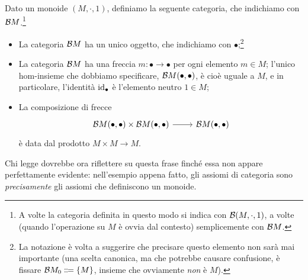 \begin{theorem}\label{mon_sonocat}
 Dato un monoide \((M,\cdot,1)\), definiamo la seguente categoria, che indichiamo con \(\mathcal{B} M\).\footnote{A volte la categoria definita in questo modo si indica con \(\mathcal{B}(M,\cdot,1)\), a volte (quando l'operazione su \(M\) è ovvia dal contesto) semplicemente con \(\mathcal{B} M\).}
 \begin{itemize}
  \item La categoria \(\mathcal{B} M\) ha un unico oggetto, che indichiamo con \(\bullet\);\footnote{La notazione è volta a suggerire che precisare questo elemento non sarà mai importante (una scelta canonica, ma che potrebbe causare confusione, è fissare \(\susp M_0 \defeq  \{M\}\), insieme che ovviamente \emph{non} è \(M\)).}
  \item La categoria \(\mathcal{B} M\) ha una freccia \(m\colon\bullet\to\bullet\) per ogni elemento \(m\in M\); l'unico hom-insieme che dobbiamo specificare, \(\mathcal{B} M(\bullet,\bullet)\), è cioè uguale a \(M\), e in particolare, l'identità \(\mathrm{id}_\bullet\) è l'elemento neutro \(1\in M\);
  \item La composizione di frecce
        \[\longmor{\Hom{\susp M}(\bullet,\bullet)\times \Hom{\susp M}(\bullet,\bullet)}{\Hom{\susp M}(\bullet,\bullet)}\]
        è data dal prodotto \(M\times M\to M\).
 \end{itemize}
\end{theorem}
Chi legge dovrebbe ora riflettere su questa frase finché essa non appare perfettamente evidente: nell'esempio appena fatto, gli assiomi di categoria sono \emph{precisamente} gli assiomi che definiscono un monoide.

